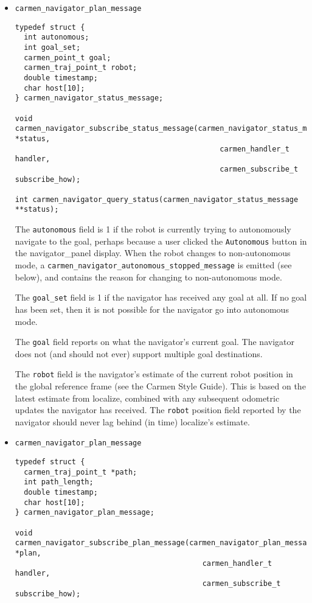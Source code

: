 \documentclass{article}
\begin{document}
\begin{itemize}

\item \verb!carmen_navigator_plan_message!

\begin{verbatim}
typedef struct {
  int autonomous;
  int goal_set;
  carmen_point_t goal;
  carmen_traj_point_t robot;
  double timestamp;
  char host[10];
} carmen_navigator_status_message;

void carmen_navigator_subscribe_status_message(carmen_navigator_status_message *status,
                                               carmen_handler_t handler,
                                               carmen_subscribe_t subscribe_how);

int carmen_navigator_query_status(carmen_navigator_status_message **status);

\end{verbatim}

The \verb!autonomous! field is 1 if the robot is currently trying to
autonomously navigate to the goal, perhaps because a user clicked the
\verb!Autonomous! button in the navigator\_panel display. When the robot
changes to non-autonomous mode, a
\verb!carmen_navigator_autonomous_stopped_message! is emitted (see below), and
contains the reason for changing to non-autonomous mode.

The \verb!goal_set! field is 1 if the navigator has received any goal at
all. If no goal has been set, then it is not possible for the navigator go
into autonomous mode. 

The \verb!goal! field reports on what the navigator's current goal. The
navigator does not (and should not ever) support multiple goal destinations. 

The \verb!robot! field is the navigator's estimate of the current robot
position in the global reference frame (see the Carmen Style Guide). This is
based on the latest estimate from localize, combined with any subsequent
odometric updates the navigator has received. The \verb!robot! position field
reported by the navigator should never lag behind (in time) localize's
estimate. 

\item \verb!carmen_navigator_plan_message!

\begin{verbatim}
typedef struct {
  carmen_traj_point_t *path;
  int path_length;
  double timestamp;
  char host[10];
} carmen_navigator_plan_message;

void carmen_navigator_subscribe_plan_message(carmen_navigator_plan_message *plan,
                                           carmen_handler_t handler,
                                           carmen_subscribe_t subscribe_how);


\end{verbatim}
\end{itemize}
\end{document}
